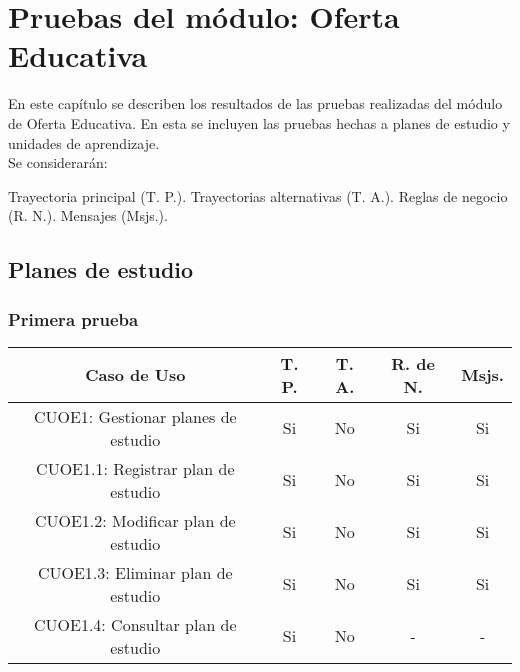 \newpage

\section{Pruebas del módulo: Oferta Educativa} \label{chp:pruebasOfertaEducativa}
	En este capítulo se describen los resultados de las pruebas realizadas del módulo de Oferta Educativa. En esta se incluyen las pruebas hechas a planes de estudio y unidades de aprendizaje. \\

	Se considerarán: \\
	\begin{Titemize}
		\Titem Trayectoria principal (T. P.).
		\Titem Trayectorias alternativas (T. A.).
		\Titem Reglas de negocio (R. N.).
		\Titem Mensajes (Msjs.).
	\end{Titemize}


\subsection{Planes de estudio}

\subsubsection{Primera prueba}
\begin{center}
	\begin{tabular}{ |c|c|c|c|c| } 
		\hline
		Caso de Uso & T. P. & T. A. & R. de N. & Msjs. \\
		\hline 
		CUOE1: Gestionar planes de estudio & Si & No & Si & Si \\ 
		CUOE1.1: Registrar plan de estudio & Si & No & Si & Si \\ 
		CUOE1.2: Modificar plan de estudio & Si & No & Si & Si \\ 
		CUOE1.3: Eliminar plan de estudio & Si & No & Si & Si \\ 
		CUOE1.4: Consultar plan de estudio & Si & No & - & - \\  
		\hline
	\end{tabular}
\end{center}


